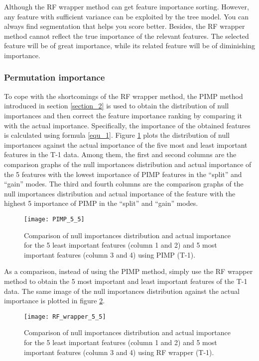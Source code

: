\documentclass[review]{elsarticle}
\begin{document}
Although the RF wrapper method can get feature importance sorting. However, any feature with sufficient variance can be exploited by the tree model. You can always find segmentation that helps you score better. Besides, the RF wrapper method cannot reflect the true importance of the relevant features. The selected feature will be of great importance, while its related feature will be of diminishing importance.

\subsubsection{Permutation importance}
To cope with the shortcomings of the RF wrapper method, the PIMP method introduced in section \ref{section_2} is used to obtain the distribution of null importances and then correct the feature importance ranking by comparing it with the actual importance. Specifically, the importance of the obtained features is calculated using formula \ref{equ_1}. Figure \ref{fig: null vs actual (PIMP)} plots the distribution of null importances against the actual importance of the five most and least important features in the T-1 data. Among them, the first and second columns are the comparison graphs of the null importances distribution and actual importance of the 5 features with the lowest importance of PIMP features in the ``split'' and ``gain'' modes. The third and fourth columns are the comparison graphs of the null importances distribution and actual importance of the feature with the highest 5 importance of PIMP in the ``split'' and ``gain'' modes.

\begin{figure}[H]
    \centering
    \texttt{[image: PIMP\_5\_5]}
    \caption{Comparison of null importances distribution and actual importance for the 5 least important features (column 1 and 2) and 5 most important features (column 3 and 4) using PIMP (T-1).}
    \label{fig: null vs actual (PIMP)}
\end{figure}

As a comparison, instead of using the PIMP method, simply use the RF wrapper method to obtain the 5 most important and least important features of the T-1 data. The same image of the null importances distribution against the actual importance is plotted in figure \ref{fig: null vs actual (RF wrapper)}.

\begin{figure}[H]
    \centering
    \texttt{[image: RF\_wrapper\_5\_5]}
    \caption{Comparison of null importances distribution and actual importance for the 5 least important features (column 1 and 2) and 5 most important features (column 3 and 4) using RF wrapper (T-1).}
    \label{fig: null vs actual (RF wrapper)}
\end{figure}
\end{document}
